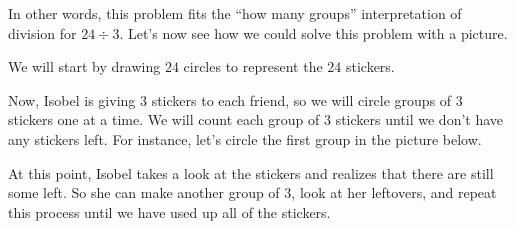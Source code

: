 \documentclass{ximera}
\begin{document}
\begin{example}
In other words, this problem fits the ``how many groups'' interpretation of division for $24 \div 3$. Let's now see how we could solve this problem with a picture.

We will start by drawing $24$ circles to represent the $24$ stickers.

\begin{image}
\end{image}

Now, Isobel is giving $3$ stickers to each friend, so we will circle groups of $3$ stickers one at a time. We will count each group of $3$ stickers until we don't have any stickers left. For instance, let's circle the first group in the picture below.

\begin{image}
\end{image}

At this point, Isobel takes a look at the stickers and realizes that there are still some left. So she can make another group of $3$, look at her leftovers, and repeat this process until we have used up all of the stickers.

\begin{image}
\end{image}

\end{example}
\end{document}
